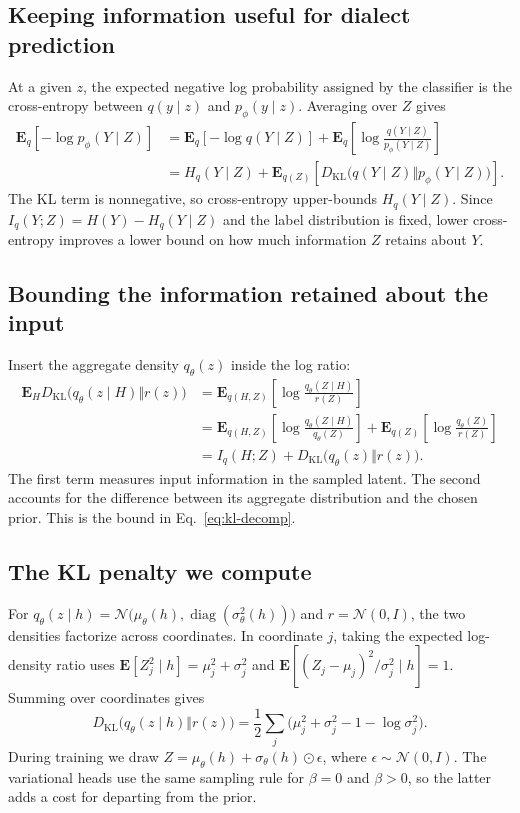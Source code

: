 \documentclass[11pt]{article}
\begin{document}
\subsection{Keeping information useful for dialect prediction}
At a given \(z\), the expected negative log probability assigned by the
classifier is the cross-entropy between \(q(y\mid z)\) and \(p_\phi(y\mid z)\).
Averaging over \(Z\) gives
\begin{align}
 \mathbf{E}_q[-\log p_\phi(Y\mid Z)]
 &= \mathbf{E}_q[-\log q(Y\mid Z)]
    +\mathbf{E}_q\!\left[\log\frac{q(Y\mid Z)}{p_\phi(Y\mid Z)}\right]\\
 &= H_q(Y\mid Z)+\mathbf{E}_{q(Z)}
       \!\left[D_{\mathrm{KL}}\bigl(q(Y\mid Z)\Vert p_\phi(Y\mid Z)\bigr)\right].
\end{align}
The KL term is nonnegative, so cross-entropy upper-bounds \(H_q(Y\mid Z)\).
Since \(I_q(Y;Z)=H(Y)-H_q(Y\mid Z)\) and the label distribution is fixed,
lower cross-entropy improves a lower bound on how much information \(Z\)
retains about \(Y\).

\subsection{Bounding the information retained about the input}
Insert the aggregate density \(q_\theta(z)\) inside the log ratio:
\begin{align}
 \mathbf{E}_{H}D_{\mathrm{KL}}\bigl(q_\theta(z\mid H)\Vert r(z)\bigr)
 &= \mathbf{E}_{q(H,Z)}
       \!\left[\log\frac{q_\theta(Z\mid H)}{r(Z)}\right]\\
 &= \mathbf{E}_{q(H,Z)}
       \!\left[\log\frac{q_\theta(Z\mid H)}{q_\theta(Z)}\right]
    + \mathbf{E}_{q(Z)}
       \!\left[\log\frac{q_\theta(Z)}{r(Z)}\right]\\
 &= I_q(H;Z)+D_{\mathrm{KL}}\bigl(q_\theta(z)\Vert r(z)\bigr).
\end{align}
The first term measures input information in the sampled latent. The second
accounts for the difference between its aggregate distribution and the
chosen prior. This is the bound in Eq.~\ref{eq:kl-decomp}.

\subsection{The KL penalty we compute}
For \(q_\theta(z\mid h)=
\mathcal{N}\bigl(\mu_\theta(h),\operatorname{diag}(\sigma_\theta^2(h))\bigr)\)
and \(r=\mathcal{N}(0,I)\), the two densities factorize across coordinates.
In coordinate \(j\), taking the expected log-density ratio uses
\(\mathbf{E}[Z_j^2\mid h]=\mu_j^2+\sigma_j^2\) and
\(\mathbf{E}[(Z_j-\mu_j)^2/\sigma_j^2\mid h]=1\). Summing over coordinates gives
\[
 D_{\mathrm{KL}}\bigl(q_\theta(z\mid h)\Vert r(z)\bigr)
 = \frac12\sum_j\bigl(\mu_j^2+\sigma_j^2-1-\log\sigma_j^2\bigr).
\]
During training we draw \(Z=\mu_\theta(h)+\sigma_\theta(h)\odot\epsilon\),
where \(\epsilon\sim\mathcal{N}(0,I)\). The variational heads use the same
sampling rule for \(\beta=0\) and \(\beta>0\), so the latter adds a cost for
departing from the prior.
\end{document}

